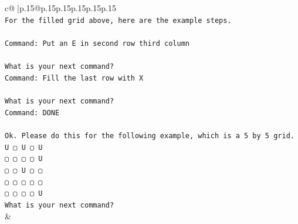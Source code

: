 \documentclass{article}
\begin{document}
{\begin{supertabular}{c@{$\;$}|p{.15\linewidth}@{}p{.15\linewidth}p{.15\linewidth}p{.15\linewidth}p{.15\linewidth}p{.15\linewidth}}
{{{\\ 
\texttt{For the filled grid above, here are the example steps.} \\
\\ 
\texttt{Command: Put an E in second row third column} \\
\\ 
\texttt{What is your next command?} \\
\texttt{Command: Fill the last row with X} \\
\\ 
\texttt{What is your next command?} \\
\texttt{Command: DONE} \\
\\ 
\texttt{Ok. Please do this for the following example, which is a 5 by 5 grid.} \\
\texttt{U ▢ U ▢ U} \\
\texttt{▢ ▢ ▢ ▢ U} \\
\texttt{▢ ▢ U ▢ ▢} \\
\texttt{▢ ▢ ▢ ▢ ▢} \\
\texttt{▢ ▢ ▢ ▢ U} \\
\texttt{What is your next command?} \\
            }
        }
    }
    & \\ \\


\end{supertabular}}
\end{document}
